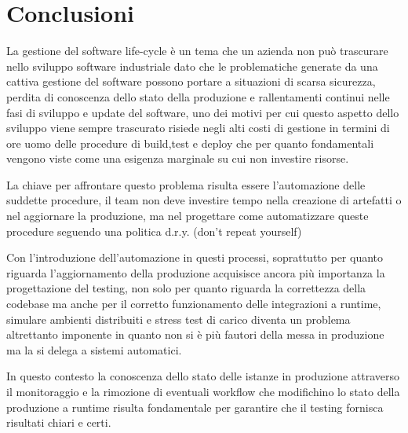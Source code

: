 \chapter{Conclusioni}

La gestione del software life-cycle è un tema che un azienda non può trascurare nello sviluppo software industriale dato che le problematiche generate da una cattiva gestione del software possono portare a situazioni di scarsa sicurezza, perdita di conoscenza dello stato della produzione e rallentamenti continui nelle fasi di sviluppo e update del software, uno dei motivi per cui questo aspetto dello sviluppo viene sempre trascurato risiede negli alti costi di gestione in termini di ore uomo delle procedure di build,test e deploy che per quanto fondamentali vengono viste come una esigenza marginale su cui non investire risorse.

La chiave per affrontare questo problema risulta essere l'automazione delle suddette procedure, il team non deve investire tempo nella creazione di artefatti o nel aggiornare la produzione, ma nel progettare come automatizzare queste procedure seguendo una politica d.r.y. (don't repeat yourself)

Con l'introduzione dell'automazione in questi processi, soprattutto per quanto riguarda l'aggiornamento della produzione acquisisce ancora più importanza la progettazione del testing, non solo per quanto riguarda la correttezza della codebase ma anche per il corretto funzionamento delle integrazioni a runtime, simulare ambienti distribuiti e stress test di carico diventa un problema altrettanto imponente in quanto non si è più fautori della messa in produzione ma la si delega a sistemi automatici.

In questo contesto la conoscenza dello stato delle istanze in produzione attraverso il monitoraggio e la rimozione di eventuali workflow che modifichino lo stato della produzione a runtime risulta fondamentale per garantire che il testing fornisca risultati chiari e certi.
